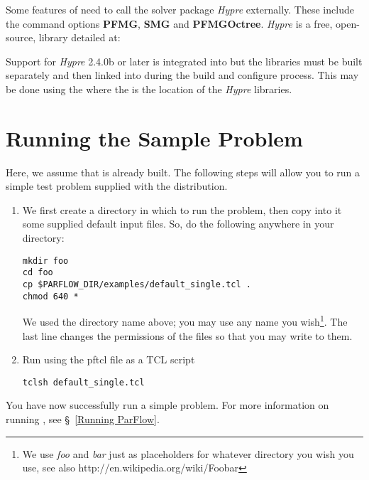 Some features of \parflow{} need to call the solver package \emph{Hypre} externally.  
These include the command options {\bf PFMG}, {\bf SMG} and  {\bf PFMGOctree}. \emph{Hypre} is a
free, open-source, library detailed at:
\begin{center}
\end{center}
Support for \emph{Hypre} 2.4.0b or later is integrated into \parflow{} but the libraries
must be built separately and then linked into \parflow{} during the build and configure process. 
This may be done using the  where the  is the location of the
\emph{Hypre} libraries.

\section{Running the Sample Problem}
\label{Running the Sample Problem}

Here, we assume that \parflow{} is already built.  The following steps
 will allow you to run a simple test problem supplied with the
 distribution.
\begin{enumerate}

\item
We first create a directory in which to run the problem,
then copy into it some supplied default input files.
So, do the following anywhere in your  directory:
\begin{display}\begin{verbatim}
mkdir foo
cd foo
cp $PARFLOW_DIR/examples/default_single.tcl .
chmod 640 *
\end{verbatim}\end{display}
We used the directory name  above;
you may use any name you wish\footnote{We use \emph{foo} and \emph{bar} 
just as placeholders for whatever directory you wish you use, 
see also http://en.wikipedia.org/wiki/Foobar}.
The last line changes the permissions of the files so that
you may write to them.

\item
Run \parflow{} using the pftcl file as a TCL script
\begin{display}\begin{verbatim}
tclsh default_single.tcl
\end{verbatim}\end{display}

\end{enumerate}
You have now successfully run a simple \parflow{} problem.
For more information on running \parflow{},
see \S~\ref{Running ParFlow}.



